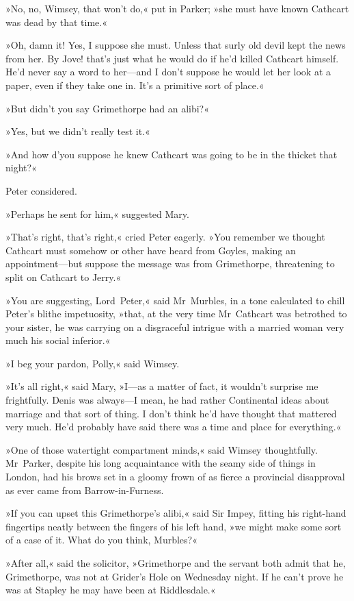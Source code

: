 »No, no, Wimsey, that won't do,« put in Parker; »she must have known Cathcart was dead by that time.«

»Oh, damn it! Yes, I suppose she must. Unless that surly old devil kept the news from her. By Jove! that's just what he would do if he'd killed Cathcart himself. He'd never say a word to her—and I don't suppose he would let her look at a paper, even if they take one in. It's a primitive sort of place.«

»But didn't you say Grimethorpe had an alibi?«

»Yes, but we didn't really test it.«

»And how d'you suppose he knew Cathcart was going to be in the thicket that night?«

Peter considered.

»Perhaps he sent for him,« suggested Mary.

»That's right, that's right,« cried Peter eagerly. »You remember we thought Cathcart must somehow or other have heard from Goyles, making an appointment—but suppose the message was from Grimethorpe, threatening to split on Cathcart to Jerry.«

»You are suggesting, Lord~Peter,« said Mr~Murbles, in a tone calculated to chill Peter's blithe impetuosity, »that, at the very time Mr~Cathcart was betrothed to your sister, he was carrying on a disgraceful intrigue with a married woman very much his social inferior.«

»I beg your pardon, Polly,« said Wimsey.

»It's all right,« said Mary, »I—as a matter of fact, it wouldn't surprise me frightfully. Denis was always—I mean, he had rather Continental ideas about marriage and that sort of thing. I don't think he'd have thought that mattered very much. He'd probably have said there was a time and place for everything.«

»One of those watertight compartment minds,« said Wimsey thoughtfully.  Mr~Parker, despite his long acquaintance with the seamy side of things in London, had his brows set in a gloomy frown of as fierce a provincial disapproval as ever came from Barrow-in-Furness.

»If you can upset this Grimethorpe's alibi,« said Sir Impey, fitting his right-hand fingertips neatly between the fingers of his left hand, »we might make some sort of a case of it. What do you think, Murbles?«

»After all,« said the solicitor, »Grimethorpe and the servant both admit that he, Grimethorpe, was not at Grider's Hole on Wednesday night. If he can't prove he was at Stapley he may have been at Riddlesdale.«

